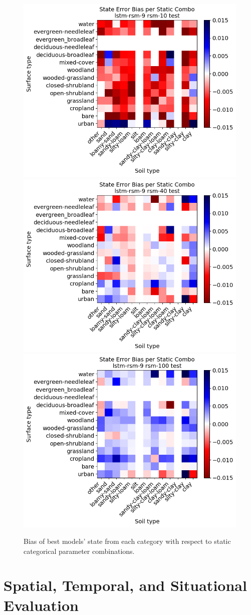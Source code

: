 \begin{figure}[hp!]
    \includegraphics[width=.32\linewidth,draft=false]{figures/static-combos/eval_test_lstm-rsm-9_rsm-10_static-combos_bias_state.png}
    \includegraphics[width=.32\linewidth,draft=false]{figures/static-combos/eval_test_lstm-rsm-9_rsm-40_static-combos_bias_state.png}
    \includegraphics[width=.32\linewidth,draft=false]{figures/static-combos/eval_test_lstm-rsm-9_rsm-100_static-combos_bias_state.png}


    \caption{Bias of best models' state from each category with respect to static categorical parameter combinations.}
    \label{best-static-bias}
\end{figure}

\section{Spatial, Temporal, and Situational Evaluation}


